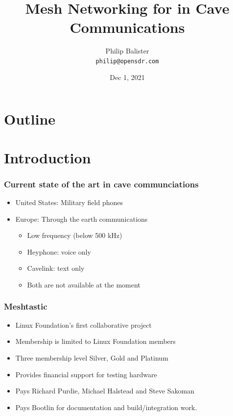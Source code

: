 \documentclass{beamer}
\title{Mesh Networking for in Cave Communications}
\institute{Open SDR}
\author{Philip Balister \\
\tt\tiny philip@opensdr.com}
\date{Dec 1, 2021}
\begin{document}
 

\begin{frame}
\titlepage
\end{frame}

\section*{Outline}

\begin{frame}
  \tableofcontents
\end{frame}

\section{Introduction}

\begin{frame}
\frametitle{Current state of the art in cave communciations}

\begin{itemize}
\item United States: Military field phones
\item Europe: Through the earth communications
	\begin{itemize}
	\item Low frequency (below 500 kHz)
	\item Heyphone: voice only
	\item Cavelink: text only
	\item Both are not available at the moment
	\end{itemize}
\end{itemize}

\end{frame}

\begin{frame}
\frametitle{Meshtastic}

\begin{itemize}
\item Linux Foundation's first collaborative project
\item Membership is limited to Linux Foundation members
\item Three membership level Silver, Gold and Platinum
\item Provides financial support for testing hardware
\item Pays Richard Purdie, Michael Halstead and Steve Sakoman
\item Pays Bootlin for documentation and build/integration work. 
\end{itemize}

\end{frame}
\end{document}
